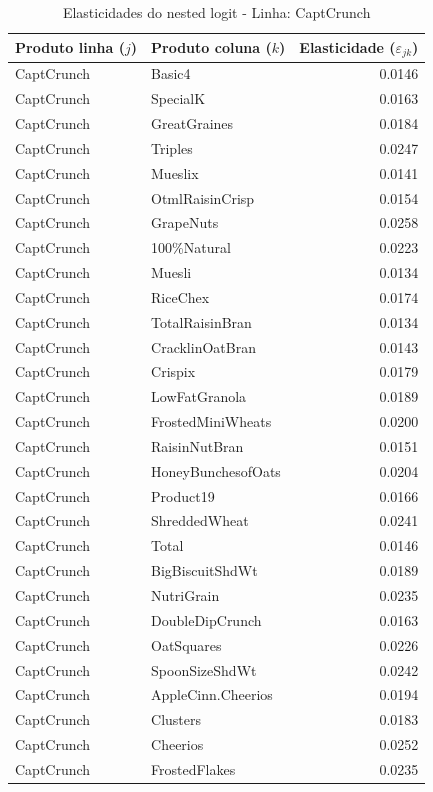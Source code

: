 \begingroup
\begin{table}[H]
\centering
\caption{Elasticidades do nested logit - Linha: CaptCrunch}
\label{tab:elas-nested-captcrunch}
\small
\begin{tabular}{llr}
\toprule
Produto linha ($j$) & Produto coluna ($k$) & Elasticidade ($\varepsilon_{jk}$) \\
\midrule
CaptCrunch & Basic4 & 0.0146 \\
CaptCrunch & SpecialK & 0.0163 \\
CaptCrunch & GreatGraines & 0.0184 \\
CaptCrunch & Triples & 0.0247 \\
CaptCrunch & Mueslix & 0.0141 \\
CaptCrunch & OtmlRaisinCrisp & 0.0154 \\
CaptCrunch & GrapeNuts & 0.0258 \\
CaptCrunch & 100\%Natural & 0.0223 \\
CaptCrunch & Muesli & 0.0134 \\
CaptCrunch & RiceChex & 0.0174 \\
CaptCrunch & TotalRaisinBran & 0.0134 \\
CaptCrunch & CracklinOatBran & 0.0143 \\
CaptCrunch & Crispix & 0.0179 \\
CaptCrunch & LowFatGranola & 0.0189 \\
CaptCrunch & FrostedMiniWheats & 0.0200 \\
CaptCrunch & RaisinNutBran & 0.0151 \\
CaptCrunch & HoneyBunchesofOats & 0.0204 \\
CaptCrunch & Product19 & 0.0166 \\
CaptCrunch & ShreddedWheat & 0.0241 \\
CaptCrunch & Total & 0.0146 \\
CaptCrunch & BigBiscuitShdWt & 0.0189 \\
CaptCrunch & NutriGrain & 0.0235 \\
CaptCrunch & DoubleDipCrunch & 0.0163 \\
CaptCrunch & OatSquares & 0.0226 \\
CaptCrunch & SpoonSizeShdWt & 0.0242 \\
CaptCrunch & AppleCinn.Cheerios & 0.0194 \\
CaptCrunch & Clusters & 0.0183 \\
CaptCrunch & Cheerios & 0.0252 \\
CaptCrunch & FrostedFlakes & 0.0235 \\

\end{tabular}
\end{table}
